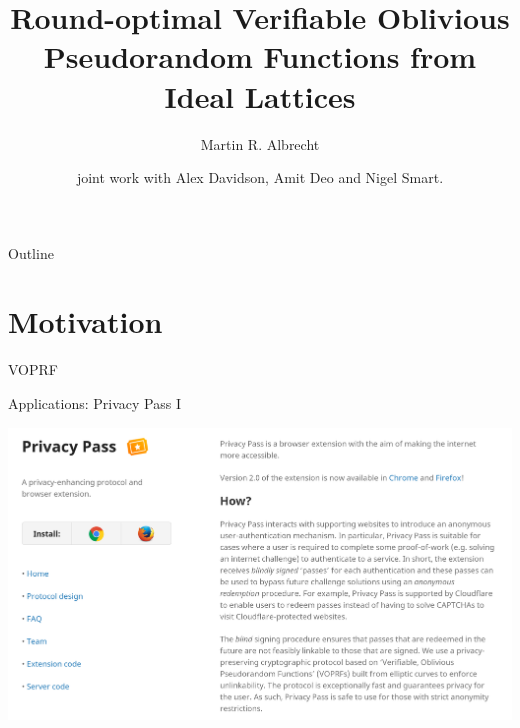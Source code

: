 \documentclass[xcolor=table,10pt,aspectratio=169]{beamer}
\author{Martin R. Albrecht}
\date{joint work with Alex Davidson, Amit Deo and Nigel Smart.}
\title{Round-optimal Verifiable Oblivious Pseudorandom Functions from Ideal Lattices}
\begin{document}
\maketitle
\begin{frame}{Outline}
\tableofcontents
\end{frame}


\section{Motivation}
\label{sec:orgc236300}

\begin{frame}[label={sec:org776170f}]{VOPRF}
\end{frame}

\begin{frame}[label={sec:org9dae013}]{Applications: Privacy Pass I}
\begin{center}
\includegraphics[width=0.8\linewidth]{./privacy-pass.png}
\end{center}
\end{frame}
\end{document}
